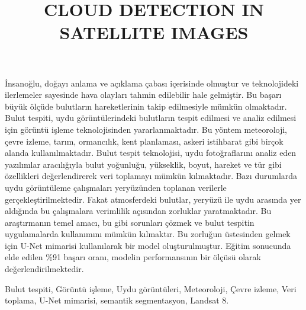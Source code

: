 \documentclass[conference]{IEEEtran}
\begin{document}
\title{CLOUD DETECTION IN SATELLITE IMAGES}


\author{
}

\maketitle

\begin{ozet}
İnsanoğlu, doğayı anlama ve açıklama çabası içerisinde olmuştur ve teknolojideki ilerlemeler sayesinde hava olayları tahmin edilebilir hale gelmiştir. Bu başarı büyük ölçüde bulutların hareketlerinin takip edilmesiyle mümkün olmaktadır. Bulut tespiti, uydu görüntülerindeki bulutların tespit edilmesi ve analiz edilmesi için görüntü işleme teknolojisinden yararlanmaktadır. Bu yöntem meteoroloji, çevre izleme, tarım, ormancılık, kent planlaması, askeri istihbarat gibi birçok alanda kullanılmaktadır. Bulut tespit teknolojisi, uydu fotoğraflarını analiz eden yazılımlar aracılığıyla bulut yoğunluğu, yükseklik, boyut, hareket ve tür gibi özellikleri değerlendirerek veri toplamayı mümkün kılmaktadır. Bazı durumlarda uydu görüntüleme çalışmaları yeryüzünden toplanan verilerle gerçekleştirilmektedir. Fakat atmosferdeki bulutlar, yeryüzü ile uydu arasında yer aldığında bu çalışmalara verimlilik açısından zorluklar yaratmaktadır. Bu araştırmanın temel amacı, bu gibi sorunları çözmek ve bulut tespitin uygulamalarda kullanımını mümkün kılmaktır. Bu zorluğun üstesinden gelmek için U-Net mimarisi kullanılarak bir model oluşturulmuştur. Eğitim sonucunda elde edilen \%91 başarı oranı, modelin performansının bir ölçüsü olarak değerlendirilmektedir.
\end{ozet}
\begin{IEEEanahtar}
Bulut tespiti, Görüntü işleme, Uydu görüntüleri, Meteoroloji, Çevre izleme, Veri toplama, U-Net mimarisi, semantik segmentasyon, Landsat 8.
\end{IEEEanahtar}
\end{document}
